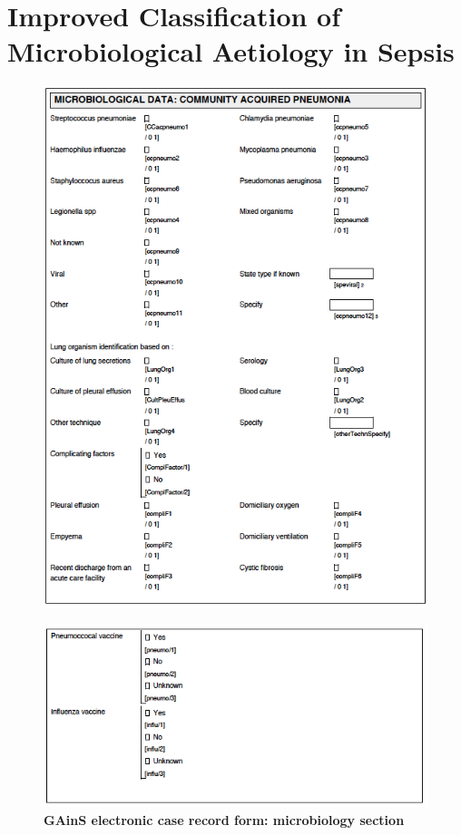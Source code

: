 \chapter{Improved Classification of Microbiological Aetiology in Sepsis}
\label{ch:AppResults2}
\begin{figure}[htbp]
\centering
\includegraphics[scale=0.7]{./Appendices/Images/eCRF1.png}
\end{figure}

\begin{figure}[htbp]
\centering
\includegraphics[scale=0.7]{./Appendices/Images/eCRF2.png}
\caption[Electronic case record form]{\textbf{GAinS electronic case record form: microbiology section}}
\label{fig:eCRF}
\end{figure}

